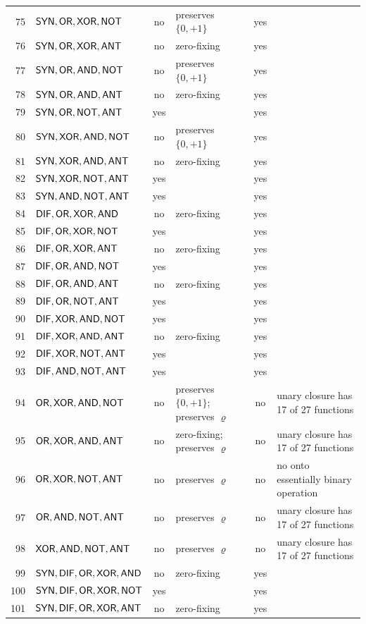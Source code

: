 \documentclass[10pt,a4paper]{article}
\begin{document}
\begin{center}
\begin{longtable}{rlcp{3.9cm}cp{3.9cm}}
75&$\SYN, \OR, \XOR, \NOT$&no&preserves $\{0,+1\}$&yes&\\
76&$\SYN, \OR, \XOR, \ANT$&no&zero-fixing&yes&\\
77&$\SYN, \OR, \AND, \NOT$&no&preserves $\{0,+1\}$&yes&\\
78&$\SYN, \OR, \AND, \ANT$&no&zero-fixing&yes&\\
79&$\SYN, \OR, \NOT, \ANT$&yes&&yes&\\
80&$\SYN, \XOR, \AND, \NOT$&no&preserves $\{0,+1\}$&yes&\\
81&$\SYN, \XOR, \AND, \ANT$&no&zero-fixing&yes&\\
82&$\SYN, \XOR, \NOT, \ANT$&yes&&yes&\\
83&$\SYN, \AND, \NOT, \ANT$&yes&&yes&\\
84&$\DIF, \OR, \XOR, \AND$&no&zero-fixing&yes&\\
85&$\DIF, \OR, \XOR, \NOT$&yes&&yes&\\
86&$\DIF, \OR, \XOR, \ANT$&no&zero-fixing&yes&\\
87&$\DIF, \OR, \AND, \NOT$&yes&&yes&\\
88&$\DIF, \OR, \AND, \ANT$&no&zero-fixing&yes&\\
89&$\DIF, \OR, \NOT, \ANT$&yes&&yes&\\
90&$\DIF, \XOR, \AND, \NOT$&yes&&yes&\\
91&$\DIF, \XOR, \AND, \ANT$&no&zero-fixing&yes&\\
92&$\DIF, \XOR, \NOT, \ANT$&yes&&yes&\\
93&$\DIF, \AND, \NOT, \ANT$&yes&&yes&\\
94&$\OR, \XOR, \AND, \NOT$&no&preserves $\{0,+1\}$; preserves $\varrho$&no&unary closure has 17 of 27 functions\\
95&$\OR, \XOR, \AND, \ANT$&no&zero-fixing; preserves $\varrho$&no&unary closure has 17 of 27 functions\\
96&$\OR, \XOR, \NOT, \ANT$&no&preserves $\varrho$&no&no onto essentially binary operation\\
97&$\OR, \AND, \NOT, \ANT$&no&preserves $\varrho$&no&unary closure has 17 of 27 functions\\
98&$\XOR, \AND, \NOT, \ANT$&no&preserves $\varrho$&no&unary closure has 17 of 27 functions\\
99&$\SYN, \DIF, \OR, \XOR, \AND$&no&zero-fixing&yes&\\
100&$\SYN, \DIF, \OR, \XOR, \NOT$&yes&&yes&\\
101&$\SYN, \DIF, \OR, \XOR, \ANT$&no&zero-fixing&yes&\\

\end{longtable}
\end{center}
\end{document}
